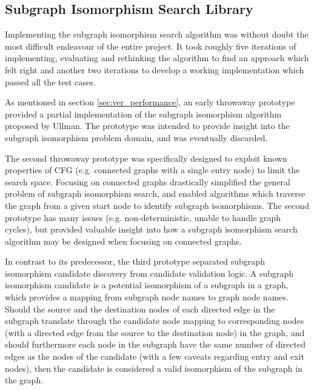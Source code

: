 
\subsection{Subgraph Isomorphism Search Library}
\label{sec:impl_subgraph_isomorphism_search_library}

Implementing the subgraph isomorphism search algorithm was without doubt the most difficult endeavour of the entire project. It took roughly five iterations of implementing, evaluating and rethinking the algorithm to find an approach which felt right and another two iterations to develop a working implementation which passed all the test cases.

As mentioned in section \ref{sec:ver_performance}, an early throwaway prototype provided a partial implementation of the subgraph isomorphism algorithm proposed by Ullman. The prototype was intended to provide insight into the subgraph isomorphism problem domain, and was eventually discarded.

The second throwaway prototype was specifically designed to exploit known properties of CFG (e.g. connected graphs with a single entry node) to limit the search space. Focusing on connected graphs drastically simplified the general problem of subgraph isomorphism search, and enabled algorithms which traverse the graph from a given start node to identify subgraph isomorphisms. The second prototype has many issues (e.g. non-deterministic, unable to handle graph cycles), but provided valuable insight into how a subgraph isomorphism search algorithm may be designed when focusing on connected graphs.

In contrast to its predecessor, the third prototype separated subgraph isomorphism candidate discovery from candidate validation logic. A subgraph isomorphism candidate is a potential isomorphism of a subgraph in a graph, which provides a mapping from subgraph node names to graph node names. Should the source and the destination nodes of each directed edge in the subgraph translate through the candidate node mapping to corresponding nodes (with a directed edge from the source to the destination node) in the graph, and should furthermore each node in the subgraph have the same number of directed edges as the nodes of the candidate (with a few caveats regarding entry and exit nodes), then the candidate is considered a valid isomorphism of the subgraph in the graph.


